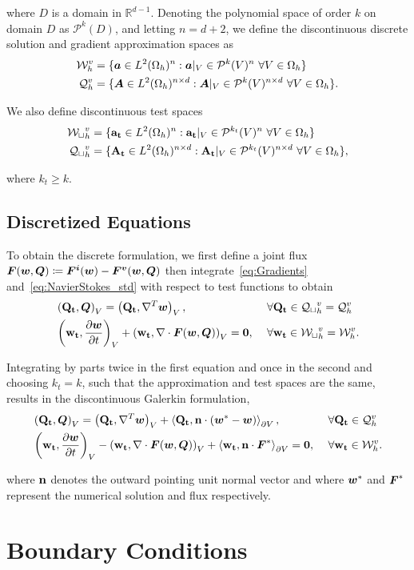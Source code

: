 where $D$ is a domain in $\mathbb{R}^{d-1}$. Denoting the polynomial space of order $k$ on domain $D$ as $\mathcal{P}^k(D)$, and letting $n = d+2$, we define the discontinuous discrete solution and gradient approximation spaces as
\begin{align*}
\mathcal{W}_h^v & = \{ \mathit{\bm{{a}}} \in L^2(\Omega_h)^{n} : \mathit{\bm{{a}}} |_V \in \mathcal{P}^k(V)^{n}\ \forall V \in \Omega_h \} \\
\mathcal{Q}_h^v & = \{ \mathit{\bm{{A}}} \in L^2(\Omega_h)^{n \times d} : \mathit{\bm{{A}}} |_V \in \mathcal{P}^k(V)^{n \times d}\ \forall V \in \Omega_h \}.
\end{align*}

We also define discontinuous test spaces
\begin{align*}
\mathcal{W_t}_h^v & = \{ \mathbf{{a_t}} \in L^2(\Omega_h)^{n} : \mathbf{{a_t}} |_V \in \mathcal{P}^{k_t}(V)^{n}\ \forall V \in \Omega_h \} \\
\mathcal{Q_t}_h^v & = \{ \mathbf{{A_t}} \in L^2(\Omega_h)^{n \times d} : \mathbf{{A_t}} |_V \in \mathcal{P}^{k_t}(V)^{n \times d}\ \forall V \in \Omega_h \},
\end{align*}

where $k_t \ge k$. 

\subsection{Discretized Equations}
To obtain the discrete formulation, we first define a joint flux $\mathit{\bm{{F}}}(\mathit{\bm{{w}}},\mathit{\bm{{Q}}}) \coloneqq \mathit{\bm{{F^i}}}(\mathit{\bm{{w}}}) - \mathit{\bm{{F^v}}}(\mathit{\bm{{w}}},\mathit{\bm{{Q}}})$ then integrate~\eqref{eq:Gradients} and~\eqref{eq:NavierStokes_std} with respect to test functions to obtain
\begin{alignat*}{3}
& \left(\vect{Q_t},\varv{Q} \right)_V = \left(\vect{Q_t},\nabla^T \varv{w}\right)_V, && \forall \vect{Q_t} \in \mathcal{Q_t}_h^v = \mathcal{Q}_h^v \\
& \left(\vect{w_t},\frac{\partial \varv{w}}{\partial t} \right)_V + 
\left(\vect{w_t}, \nabla \cdot \varv{F}(\varv{w},\varv{Q}) \right)_V = \vect{0},\ && \forall \vect{w_t} \in \mathcal{W_t}_h^v = \mathcal{W}_h^v.
\end{alignat*}

Integrating by parts twice in the first equation and once in the second and choosing $k_t = k$, such that the approximation and test spaces are the same, results in the discontinuous Galerkin formulation,
\begin{alignat*}{3}
& \left(\vect{Q_t},\varv{Q} \right)_V
=
\left(\vect{Q_t},\nabla^T \varv{w}\right)_V
+
\left<\vect{Q_t},\vect{n} \cdot \left(\varv{w}^*-\varv{w} \right)\right>_{\partial V},\ && \forall \vect{Q_t} \in \mathcal{Q}_h^v \\
& \left(\vect{w_t},\frac{\partial \varv{w}}{\partial t} \right)_V
- 
\left(\vect{w_t}, \nabla \cdot \varv{F}(\varv{w},\varv{Q}) \right)_V
+
\left<\vect{w_t}, \vect{n} \cdot \varv{F}^* \right>_{\partial V}
= \vect{0},\ && \forall \vect{w_t} \in \mathcal{W}_h^v.
\end{alignat*}

where $\mathbf{{n}}$ denotes the outward pointing unit normal vector and where $\mathit{\bm{{w}}}^*$ and $\mathit{\bm{{F}}}^*$ represent the numerical solution and flux respectively.


\section{Boundary Conditions}


